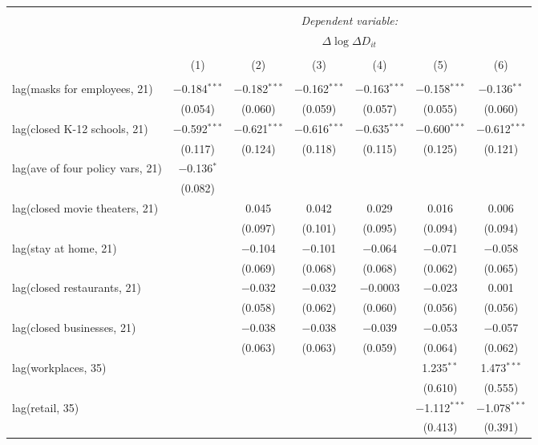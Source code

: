 \begin{tabular}{@{\extracolsep{1pt}}lcccccc} 
\\[-1.8ex]\hline 
\hline \\[-1.8ex] 
 & \multicolumn{6}{c}{\textit{Dependent variable:}} \\ 
\cline{2-7} 
 & \multicolumn{6}{c}{$\Delta \log \Delta D_{it}$} \\ 
\\[-1.8ex] & (1) & (2) & (3) & (4) & (5) & (6)\\ 
\hline \\[-1.8ex] 
 lag(masks for employees, 21) & $-$0.184$^{***}$ & $-$0.182$^{***}$ & $-$0.162$^{***}$ & $-$0.163$^{***}$ & $-$0.158$^{***}$ & $-$0.136$^{**}$ \\ 
  & (0.054) & (0.060) & (0.059) & (0.057) & (0.055) & (0.060) \\ 
  lag(closed K-12 schools, 21) & $-$0.592$^{***}$ & $-$0.621$^{***}$ & $-$0.616$^{***}$ & $-$0.635$^{***}$ & $-$0.600$^{***}$ & $-$0.612$^{***}$ \\ 
  & (0.117) & (0.124) & (0.118) & (0.115) & (0.125) & (0.121) \\ 
  lag(ave of four policy vars, 21) & $-$0.136$^{*}$ &  &  &  &  &  \\ 
  & (0.082) &  &  &  &  &  \\ 
  lag(closed movie theaters, 21) &  & 0.045 & 0.042 & 0.029 & 0.016 & 0.006 \\ 
  &  & (0.097) & (0.101) & (0.095) & (0.094) & (0.094) \\ 
  lag(stay at home, 21) &  & $-$0.104 & $-$0.101 & $-$0.064 & $-$0.071 & $-$0.058 \\ 
  &  & (0.069) & (0.068) & (0.068) & (0.062) & (0.065) \\ 
  lag(closed restaurants, 21) &  & $-$0.032 & $-$0.032 & $-$0.0003 & $-$0.023 & 0.001 \\ 
  &  & (0.058) & (0.062) & (0.060) & (0.056) & (0.056) \\ 
  lag(closed businesses, 21) &  & $-$0.038 & $-$0.038 & $-$0.039 & $-$0.053 & $-$0.057 \\ 
  &  & (0.063) & (0.063) & (0.059) & (0.064) & (0.062) \\ 
  lag(workplaces, 35) &  &  &  &  & 1.235$^{**}$ & 1.473$^{***}$ \\ 
  &  &  &  &  & (0.610) & (0.555) \\ 
  lag(retail, 35) &  &  &  &  & $-$1.112$^{***}$ & $-$1.078$^{***}$ \\ 
  &  &  &  &  & (0.413) & (0.391) \\ 

\end{tabular}
